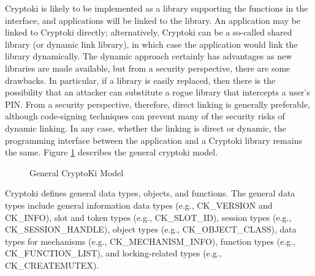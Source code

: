 \documentclass{article}
\begin{document}
Cryptoki is likely to be implemented as a library supporting the 
functions in the interface, and applications will be linked to the library.  
An application may be linked to Cryptoki directly; alternatively, 
Cryptoki can be a so-called shared library (or dynamic link library), 
in which case the application would link the library dynamically.  
The dynamic approach certainly has advantages as new libraries are 
made available, but from a security perspective, there are some drawbacks.  
In particular, if a library is easily replaced, then there is the 
possibility that an attacker can substitute a rogue library that 
intercepts a user's PIN.  From a security perspective, therefore, 
direct linking is generally preferable, although code-signing 
techniques can prevent many of the security risks of dynamic linking.  
In any case, whether the linking is direct or dynamic, the programming 
interface between the application and a Cryptoki library remains the same.
Figure \ref{pkcs11in} describes the general cryptoki model.
\begin{center}
\begin{figure}[htb]
\caption{General CryptoKi Model}
\label{pkcs11in}
\end{figure}
\end{center}


Cryptoki defines general data types, objects, and functions.
The general data types include general information data types (e.g.,
CK\_VERSION and CK\_INFO), slot and token types (e.g., CK\_SLOT\_ID),
session types (e.g., CK\_SESSION\_HANDLE), object types 
(e.g., CK\_OBJECT\_CLASS), data types for mechanisms 
(e.g., CK\_MECHANISM\_INFO), function types (e.g., CK\_FUNCTION\_LIST), and 
locking-related types (e.g., CK\_CREATEMUTEX).
\end{document}
